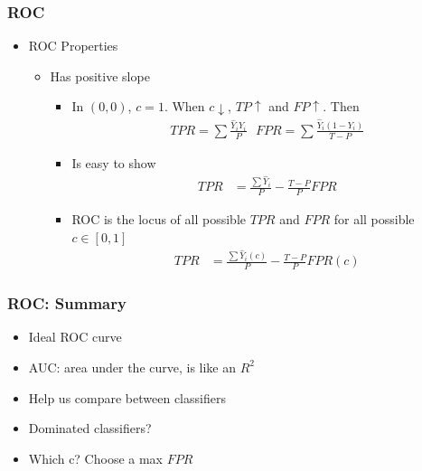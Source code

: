 \documentclass[
  shownotes,
  xcolor={svgnames},
  hyperref={colorlinks,citecolor=DarkBlue,linkcolor=DarkRed,urlcolor=DarkBlue}
  , aspectratio=169]{beamer}
\begin{document}
\begin{frame}[fragile]
\frametitle{ROC}
\begin{itemize}
  \item ROC Properties 

  \begin{itemize}
  \item Has positive slope
  \begin{itemize}
    \item In $(0,0)$, $c=1$. When $c\downarrow$, $TP \uparrow$ and $FP\uparrow$. Then
    \begin{align}
    TPR = \sum \frac{\hat{Y}_iY_i}{P} \,\,\,\, FPR = \sum \frac{\hat{Y}_i(1-Y_i)}{T-P}
    \end{align}
    \item Is easy to show
    \begin{align}
    TPR &= \frac{\sum \hat{Y}_i}{P} - \frac{T-P}{P}FPR
    \end{align}
    \item ROC is the locus of all possible $TPR$ and $FPR$ for all possible $c\in[0,1]$ 
    \begin{align}
    TPR &= \frac{\sum \hat{Y}_i(c)}{P} - \frac{T-P}{P}FPR(c)
    \end{align}
  \end{itemize}
\end{itemize}  
\end{itemize}




\end{frame}
\begin{frame}[fragile]
\frametitle{ROC: Summary}

\begin{itemize}
  \item Ideal ROC curve
  \medskip
  \item AUC: area under the curve, is like an $R^2$
  \medskip
  \item Help us compare between classifiers
  \medskip
  \item Dominated classifiers?
  \medskip
  \item Which c? Choose a max $FPR$

\end{itemize}

\end{frame}


\end{document}
